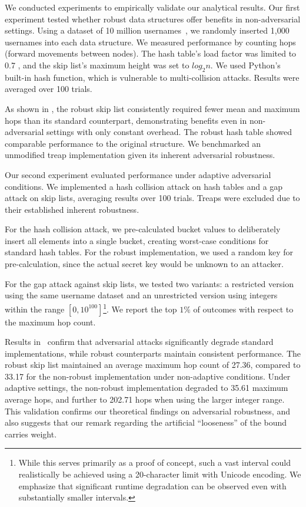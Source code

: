 We conducted experiments to empirically validate our analytical results. Our first experiment tested whether robust data structures offer benefits in non-adversarial settings. Using a dataset of 10 million usernames~\cite{10-mio}, we randomly inserted 1,000 usernames into each data structure. We measured performance by counting hops (forward movements between nodes). The hash table's load factor was limited to 0.7 \cite{mcclellan1974art}, and the skip list's maximum height was set to $log_{2} n$. We used Python's built-in hash function, which is vulnerable to multi-collision attacks. Results were averaged over 100 trials.

As shown in , the robust skip list consistently required fewer mean and maximum hops than its standard counterpart, demonstrating benefits even in non-adversarial settings with only constant overhead. The robust hash table showed comparable performance to the original structure. We benchmarked an unmodified treap implementation given its inherent adversarial robustness.

Our second experiment evaluated performance under adaptive adversarial conditions. We implemented a hash collision attack on hash tables and a gap attack on skip lists, averaging results over 100 trials. Treaps were excluded due to their established inherent robustness.

For the hash collision attack, we pre-calculated bucket values to deliberately insert all elements into a single bucket, creating worst-case conditions for standard hash tables. For the robust implementation, we used a random key for pre-calculation, since the actual secret key would be unknown to an attacker.

For the gap attack against skip lists, we tested two variants: a restricted version using the same username dataset and an unrestricted version using integers within the range $[0, 10^{100}]$\footnote{While this serves primarily as a proof of concept, such a vast interval could realistically be achieved using a 20-character limit with Unicode encoding. We emphasize that significant runtime degradation can be observed even with substantially smaller intervals.}. We report the top $1\%$ of outcomes with respect to the maximum hop count.

Results in~ confirm that adversarial attacks significantly degrade standard implementations, while robust counterparts maintain consistent performance. The robust skip list maintained an average maximum hop count of 27.36, compared to 33.17 for the non-robust implementation under non-adaptive conditions. Under adaptive settings, the non-robust implementation degraded to 35.61 maximum average hops, and further to 202.71 hops when using the larger integer range. This validation confirms our theoretical findings on adversarial robustness, and also suggests that our remark regarding the artificial ``looseness'' of the bound carries weight.